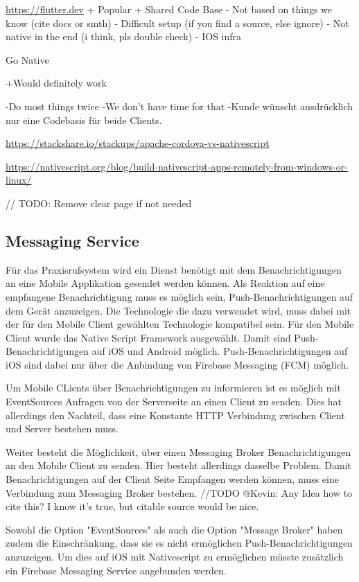  
 \url{https://flutter.dev}
    + Popular
    + Shared Code Base
    - Not based on things we know (cite docs or smth)
    - Difficult setup (if you find a source, else ignore)
    - Not native in the end (i think, pls double check)
    - IOS infra


Go Native

    +Would definitely work

    -Do most things twice
    -We don't have time for that
    -Kunde wünscht ausdrücklich nur eine Codebasis für beide Clients.

\url{https://stackshare.io/stackups/apache-cordova-vs-nativescript}

\url{https://nativescript.org/blog/build-nativescript-apps-remotely-from-windows-or-linux/ }

// TODO: Remove clear page if not needed
\clearpage

\subsection{Messaging Service}\label{subsec:messaging-eval}

Für das Praxisrufsystem wird ein Dienst benötigt mit dem Benachrichtigungen an eine Mobile Applikation gesendet werden können.
Als Reaktion auf eine empfangene Benachrichtigung muss es möglich sein, Push-Benachrichtigungen auf dem Gerät anzuzeigen.
Die Technologie die dazu verwendet wird, muss dabei mit der für den Mobile Client gewählten Technologie kompatibel sein.
Für den Mobile Client wurde das Native Script Framework ausgewählt.
Damit sind Push-Benachrichtigungen auf iOS und Android möglich.
Push-Benachrichtigungen auf iOS sind dabei nur über die Anbindung von Firebase Messaging (FCM) möglich.\cite{nativescript-push}

Um Mobile CLients über Benachrichtigungen zu informieren ist es möglich mit EventSources\cite{event-source} Anfragen von der Serverseite an einen Client zu senden.
Dies hat allerdings den Nachteil, dass eine Konstante HTTP Verbindung zwischen Client und Server bestehen muss.

Weiter besteht die Möglichkeit, über einen Messaging Broker Benachrichtigungen an den Mobile Client zu senden.
Hier besteht allerdings dasselbe Problem.
Damit Benachrichtigungen auf der Client Seite Empfangen werden können, muss eine Verbindung zum Messaging Broker bestehen. //TODO @Kevin: Any Idea how to cite this? I know it's true, but citable source would be nice.

Sowohl die Option "EventSources" als auch die Option "Message Broker" haben zudem die Einschränkung, dass sie es nicht ermöglichen Push-Benachrichtigungen anzuzeigen.
Um dies auf iOS mit Nativescript zu ermöglichen müsste zusätzlich ein Firebase Messaging Service angebunden werden.

